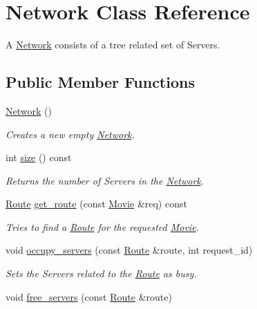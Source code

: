 \hypertarget{class_network}{
\section{Network Class Reference}
\label{class_network}
}


A \hyperlink{class_network}{Network} consists of a tree related set of Servers.  


\subsection*{Public Member Functions}
\begin{DoxyCompactItemize}
\item 
\hyperlink{class_network_a3cc2fb4f8fa4d507077e8da85ce5a1c8}{Network} ()
\begin{DoxyCompactList}\small\item\em Creates a new empty \hyperlink{class_network}{Network}. \item\end{DoxyCompactList}\item 
int \hyperlink{class_network_a107e4555116611b94cda31978f311920}{size} () const 
\begin{DoxyCompactList}\small\item\em Returns the number of Servers in the \hyperlink{class_network}{Network}. \item\end{DoxyCompactList}\item 
\hyperlink{class_route}{Route} \hyperlink{class_network_a2ab010ca2ae6f31d4efee83fe447c473}{get\_\-route} (const \hyperlink{class_movie}{Movie} \&req) const 
\begin{DoxyCompactList}\small\item\em Tries to find a \hyperlink{class_route}{Route} for the requested \hyperlink{class_movie}{Movie}. \item\end{DoxyCompactList}\item 
void \hyperlink{class_network_a3b6af9795d37156f9fa6e0fa1441bd99}{occupy\_\-servers} (const \hyperlink{class_route}{Route} \&route, int request\_\-id)
\begin{DoxyCompactList}\small\item\em Sets the Servers related to the \hyperlink{class_route}{Route} as busy. \item\end{DoxyCompactList}\item 
void \hyperlink{class_network_ac66a15e2a733d4cce9974d2e2921552f}{free\_\-servers} (const \hyperlink{class_route}{Route} \&route)

\end{DoxyCompactItemize}
